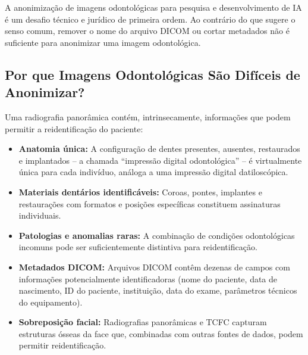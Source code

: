 \nivelcinco

A anonimização de imagens odontológicas para pesquisa e desenvolvimento de IA
é um desafio técnico e jurídico de primeira ordem. Ao contrário do que sugere o
senso comum, remover o nome do arquivo DICOM ou cortar metadados não é
suficiente para anonimizar uma imagem odontológica.

 

\subsection{Por que Imagens Odontológicas São Difíceis de Anonimizar?}

Uma radiografia panorâmica contém, intrinsecamente, informações que podem
permitir a reidentificação do paciente:

\begin{itemize}
  \item \textbf{Anatomia única:} A configuração de dentes presentes, ausentes,
    restaurados e implantados -- a chamada ``impressão digital odontológica'' --
    é virtualmente única para cada indivíduo, análoga a uma impressão digital
    datiloscópica.
  \item \textbf{Materiais dentários identificáveis:} Coroas, pontes, implantes
    e restaurações com formatos e posições específicas constituem assinaturas
    individuais.
  \item \textbf{Patologias e anomalias raras:} A combinação de condições
    odontológicas incomuns pode ser suficientemente distintiva para
    reidentificação.
  \item \textbf{Metadados DICOM:} Arquivos DICOM contêm dezenas de campos com
    informações potencialmente identificadoras (nome do paciente, data de
    nascimento, ID do paciente, instituição, data do exame, parâmetros técnicos
    do equipamento).
  \item \textbf{Sobreposição facial:} Radiografias panorâmicas e TCFC capturam
    estruturas ósseas da face que, combinadas com outras fontes de dados,
    podem permitir reidentificação.
\end{itemize}


